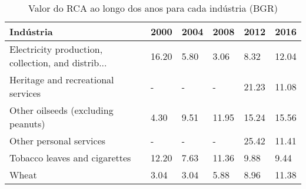 \begin{table}
\centering
\caption{Valor do RCA ao longo dos anos para cada indústria (BGR)}
\begin{tabular}{p{6cm}p{1.5cm}p{1.5cm}p{1.5cm}p{1.5cm}p{1.5cm}}
\toprule
                                         Indústria &  2000 & 2004 &  2008 &  2012 &  2016 \\
\midrule
Electricity production, collection, and distrib... & 16.20 & 5.80 &  3.06 &  8.32 & 12.04 \\
                Heritage and recreational services &     - &    - &     - & 21.23 & 11.08 \\
                Other oilseeds (excluding peanuts) &  4.30 & 9.51 & 11.95 & 15.24 & 15.56 \\
                           Other personal services &     - &    - &     - & 25.42 & 11.41 \\
                     Tobacco leaves and cigarettes & 12.20 & 7.63 & 11.36 &  9.88 &  9.44 \\
                                             Wheat &  3.04 & 3.04 &  5.88 &  8.96 & 11.38 \\
\bottomrule
\end{tabular}
\end{table}
